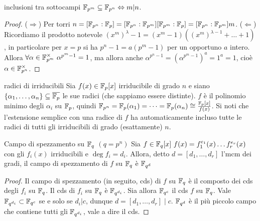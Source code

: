 \begin{proposition}{inclusioni tra sottocampi}
    $\mathbb{F}_{p^m} \subseteq \mathbb{F}_{p^n} \Leftrightarrow m | n$.
\end{proposition}
\begin{proof}
    ($\Rightarrow$) Per torri $n = [\mathbb{F}_{p^n} : \mathbb{F}_p] = [\mathbb{F}_{p^n} : \mathbb{F}_{p^m}][\mathbb{F}_{p^m} : \mathbb{F}_p] = [\mathbb{F}_{p^n} : \mathbb{F}_{p^m}]m$. ($\Leftarrow$) Ricordiamo il prodotto notevole $(x^m)^\lambda - 1 = (x^m - 1)((x^m)^{\lambda - 1} + \dots + 1)$, in particolare per $x = p$ si ha $p^n - 1 = a(p^m - 1)$ per un opportuno $a$ intero. Allora $\forall \alpha \in \mathbb{F}_{p^m}^\times \ \alpha^{p^m - 1} = 1$, ma allora anche $\alpha^{p^n - 1} = (\alpha^{p^m - 1}) ^ a = 1^a = 1$, cioè $\alpha \in \mathbb{F}_{p^n}^\times$.
\end{proof}


\begin{observation}{radici di irriducibili}
    Sia $f(x) \in \mathbb{F}_p[x]$ irriducibile di grado $n$ e siano $\{\alpha_1, \dots, \alpha_n\} \subseteq \overline{\mathbb{F}_p}$ le sue radici (che sappiamo essere distinte). $f$ è il polinomio minimo degli $\alpha_i$ su $\mathbb{F}_p$, quindi $\mathbb{F}_{p^n} = \mathbb{F}_p(\alpha_1) = \dots = \mathbb{F}_p(\alpha_n) \cong \frac{\mathbb{F}_p[x]}{f(x)}$.
    Si noti che l'estensione semplice con una radice di $f$ ha automaticamente incluso tutte le radici di tutti gli irriducibili di grado (esattamente) $n$.
\end{observation}

\begin{proposition}{Campo di spezzamento su $\mathbb{F}_q$ $(q = p^n)$}
    Sia $f \in \mathbb{F}_q[x] \ f(x) = f_1^{e_1}(x) \dots f_r^{e_r}(x)$ con gli $f_i(x)$ irriducibili e $\deg f_i = d_i$. Allora, detto $d = [d_1, \dots, d_r]$ l'mcm dei gradi, il campo di spezzamento di $f$ su $\mathbb{F}_q$ è $\mathbb{F}_{q^d}$
\end{proposition}
\begin{proof}
    Il campo di spezzamento (in seguito, cds) di $f$ su $\mathbb{F}_q$ è il composto dei cds degli $f_i$ su $\mathbb{F}_q$. Il cds di $f_i$ su $\mathbb{F}_q$ è $\mathbb{F}_{q^{d_i}}$. Sia allora $\mathbb{F}_{q^c}$ il cds $f$ su $\mathbb{F}_q$. Vale $\mathbb{F}_{q^{d_i}} \subset \mathbb{F}_{q^c}$ se e solo se $d_i | c$, dunque $d = [d_1, \dots, d_r] \mid c$. $\mathbb{F}_{q^d}$ è il più piccolo campo che contiene tutti gli $\mathbb{F}_{q^{d_i}}$, vale a dire il cds.
\end{proof}

